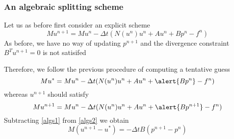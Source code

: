 
\begin{frame}
\frametitle{An algebraic splitting scheme}

Let us as before first consider an explicit scheme
\[
M u^{n+1} = M u^n - \Delta t ( N(u^n) u^n  +  A u^n +  B p^n - f^n)  
\]
As before, we have no way of updating $p^{n+1}$ and the divergence
constraint $B^T u^{n+1} = 0$ is not satisifed

\vspace{0.3cm}
Therefore, we follow the previous procedure of computing a tentative guess 
\begin{equation}
\label{algs1}
M u^{*} = M u^n - \Delta t ( N(u^n) u^n  +  A u^n +  \alert{B p^n} - f^n)  
\end{equation}
whereas $u^{n+1}$ should satisfy 
\begin{equation}
\label{algs2}
M u^{n+1} = M u^n - \Delta t ( N(u^n) u^n  +  A u^n +  \alert{B p^{n+1}} - f^n)  
\end{equation}
Subtracting \eqref{algs1} from \eqref{algs2} we obtain 
\[
M (u^{n+1} - u^*) =  - \Delta t B (p^{n+1} - p^n) 
\]

\end{frame}


